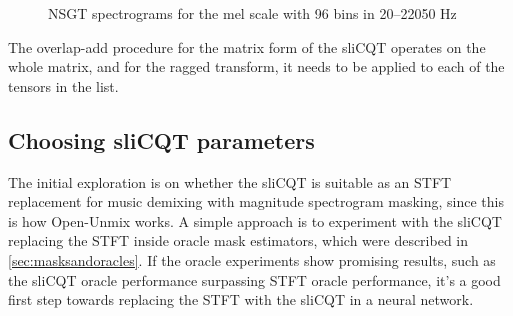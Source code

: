 \documentclass[report.tex]{subfiles}
\begin{document}
\begin{figure}[ht]
	\centering
	\hspace{0.1em}
	\caption{NSGT spectrograms for the mel scale with 96 bins in 20--22050 Hz}
	\label{fig:overlappedspectrograms}
\end{figure}

The overlap-add procedure for the matrix form of the sliCQT operates on the whole matrix, and for the ragged transform, it needs to be applied to each of the tensors in the list.

\newpagefill

\subsection{Choosing sliCQT parameters}
\label{sec:slicqparamsrch}

The initial exploration is on whether the sliCQT is suitable as an STFT replacement for music demixing with magnitude spectrogram masking, since this is how Open-Unmix works. A simple approach is to experiment with the sliCQT replacing the STFT inside oracle mask estimators, which were described in \ref{sec:masksandoracles}. If the oracle experiments show promising results, such as the sliCQT oracle performance surpassing STFT oracle performance, it's a good first step towards replacing the STFT with the sliCQT in a neural network.
\end{document}
